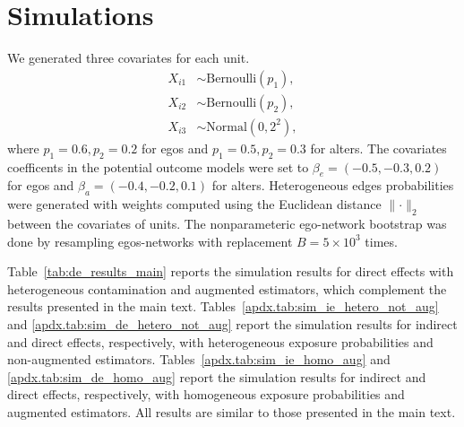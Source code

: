\documentclass[11pt]{article}
\theoremstyle{definition}
\begin{document}
\section{Simulations}
\label{apdx.sec:sim}
We generated three covariates for each unit.
\begin{equation*}
    \begin{aligned}
        X_{i1} &\sim \text{Bernoulli}(p_{1}), \\
        X_{i2} &\sim \text{Bernoulli}(p_{2}), \\
        X_{i3} &\sim \text{Normal}(0, 2^2),
    \end{aligned}
\end{equation*}
where $p_{1} = 0.6, p_{2} = 0.2$ for egos and $p_{1} = 0.5, p_{2} = 0.3$ for alters.
The covariates coefficents in the potential outcome models were set to
$\beta_e = (-0.5, -0.3, 0.2)$ for egos and $\beta_a = (-0.4, -0.2, 0.1)$ for alters.
Heterogeneous edges probabilities were generated with weights computed 
using the Euclidean distance $\lVert \cdot \rVert_2$ between the covariates of units.
The nonparameteric ego-network bootstrap was done by resampling egos-networks 
with replacement $B = 5 \times 10^3$ times.

Table~\ref{tab:de_results_main} reports the simulation results for direct effects
with heterogeneous contamination and augmented estimators,
which complement the results presented in the main text.
Tables~\ref{apdx.tab:sim_ie_hetero_not_aug} and \ref{apdx.tab:sim_de_hetero_not_aug}
report the simulation results for indirect and direct effects, respectively,
with heterogeneous exposure probabilities and non-augmented estimators.
Tables~\ref{apdx.tab:sim_ie_homo_aug} and \ref{apdx.tab:sim_de_homo_aug}
report the simulation results for indirect and direct effects, respectively,
with homogeneous exposure probabilities and augmented estimators.
All results are similar to those presented in the main text.
\end{document}

